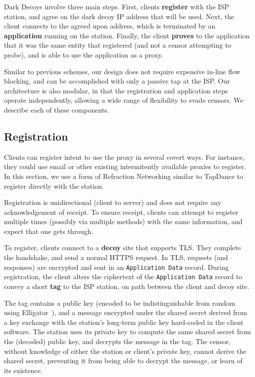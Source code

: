 \documentclass[letterpaper,twocolumn,10pt]{article}
\begin{document}
Dark Decoys involve three main steps. First, clients \textbf{register} with the
ISP station,
and agree on the dark decoy IP address that will be used. Next, the client
connects to the agreed upon address, which is terminated by an
\textbf{application} running on the station. Finally, the client \textbf{proves}
to the application that it was the same entity that registered (and not a censor
attempting to probe), and is able to use the application as a proxy.

Similar to previous schemes, our design does not require expensive in-line
flow blocking, and can be accomplished with only a passive tap at the ISP.
Our architecture is also modular, in that the registration and application steps operate
independently, allowing a wide range of flexibility to evade censors. We
describe each of these components.

\subsection{Registration}

Clients can register intent to use the proxy in several covert ways. For
instance, they could use email or other existing intermitently available proxies
to register. In this section, we use a form of Refraction Networking similar to
TapDance to register directly with the station.

Registration is unidirectional (client to server) and does not require any
acknowledgement of receipt. To ensure receipt, clients can attempt to register
multiple times (possibly via multiple methods) with the same information, and expect
that one gets through.

\medskip

To register, clients connect to a \textbf{decoy} site that supports TLS. They
complete the handshake, and send a normal HTTPS request. In TLS, requests (and
responses) are encrypted and sent in an \texttt{Application Data} record. During
registration, the client alters the ciphertext of the \texttt{Application Data} record to
convey a short \textbf{tag} to the ISP station, on path between the client and
decoy site.

The tag contains a public key (encoded to be indistinguishable from random using
Elligator~\cite{elligator}), and a message encrypted under the shared secret
derived from a key exchange with the station's long-term public key hard-coded
in the client software. The station uses its private key to compute the same
shared secret from the (decoded) public key, and decrypts the message in the
tag. The censor, without knowledge of either the station or client's private
key, cannot derive the shared secret, preventing it from being able to decrypt
the message, or learn of its existence.
\end{document}
